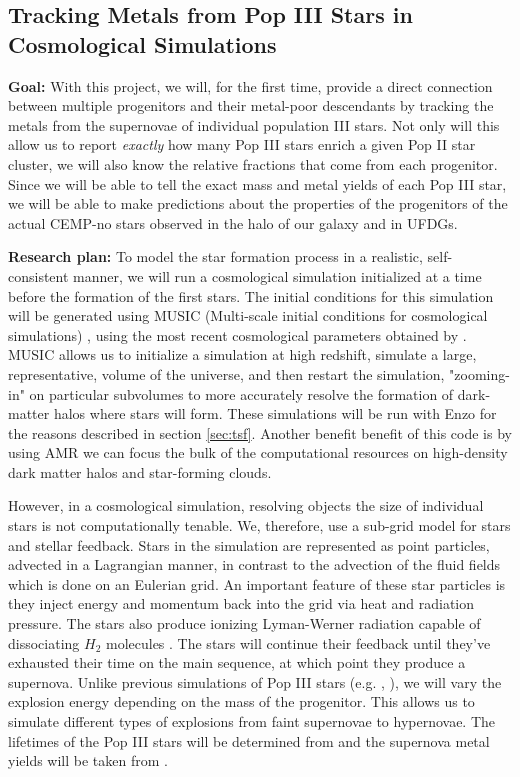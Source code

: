 \documentclass[a4paper, 12pt]{article}
\begin{document}
\subsection{Tracking Metals from Pop III Stars in Cosmological Simulations}
\label{subsec:tracer_particles}

\textbf{Goal:} With this project, we will, for the first time, provide a direct connection between multiple progenitors and their metal-poor descendants by tracking the metals from the supernovae of individual population III stars. Not only will this allow us to report \textit{exactly} how many Pop III stars enrich a given Pop II star cluster, we will also know the relative fractions that come from each progenitor. Since we will be able to tell the exact mass and metal yields of each Pop III star, we will be able to make predictions about the properties of the progenitors of the actual CEMP-no stars observed in the halo of our galaxy and in UFDGs. 

\textbf{Research plan:} To model the star formation process in a realistic, self-consistent manner, we will run a cosmological simulation initialized at a time before the formation of the first stars. The initial conditions for this simulation will be generated using MUSIC (Multi-scale initial conditions for cosmological simulations) \citep{Hahn2011}, using the most recent cosmological parameters obtained by \cite{Planck2018}. MUSIC allows us to initialize a simulation at high redshift, simulate a large, representative, volume of the universe, and then restart the simulation, "zooming-in" on particular subvolumes to more accurately resolve the formation of dark-matter halos where stars will form. These simulations will be run with Enzo for the reasons described in section \ref{sec:tsf}. Another benefit benefit of this code is by using AMR we can focus the bulk of the computational resources on high-density dark matter halos and star-forming clouds.

However, in a cosmological simulation, resolving objects the size of individual stars is not computationally tenable. We, therefore, use a sub-grid model for stars and stellar feedback. Stars in the simulation are represented as point particles, advected in a Lagrangian manner, in contrast to the advection of the fluid fields which is done on an Eulerian grid. An important feature of these star particles is they inject energy and momentum back into the grid via heat and radiation pressure. The stars also produce ionizing Lyman-Werner radiation capable of dissociating $H_2$ molecules \citep{Safranek-Shrader2012}. The stars will continue their feedback until they've exhausted their time on the main sequence, at which point they produce a supernova. Unlike previous simulations of Pop III stars (e.g. \cite{Chiaki2019}, \cite{Smith2015}), we will vary the explosion energy depending on the mass of the progenitor. This allows us to simulate different types of explosions from faint supernovae to hypernovae. The lifetimes of the Pop III stars will be determined from \cite{Schaerer2002} and the supernova metal yields will be taken from \cite{Nomoto2006}.
\end{document}
